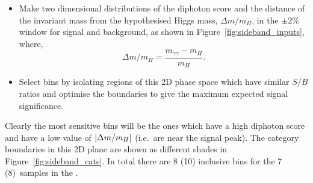 \begin{itemize}
  \item Make two dimensional distributions of the diphoton \BDT score and the distance of the invariant mass from the hypothesised Higgs mass, $\Delta m/m_{H}$, in the $\pm2$\% window for signal and background, as shown in Figure~\ref{fig:sideband_inputs}, where,
    \begin{equation}
      \Delta m/m_{H} = \frac{m_{\gamma\gamma} - m_{H}}{m_{H}}.
    \end{equation}
  \item Select bins by isolating regions of this 2D phase space which have similar $S/B$ ratios and optimise the boundaries to give the maximum expected signal significance.   
\end{itemize}

Clearly the most sensitive bins will be the ones which have a high diphoton \BDT score and have a low value of $|\Delta m/m_{H}|$ (i.e.\ are near the signal peak). The category boundaries in this 2D plane are shown as different shades in Figure~\ref{fig:sideband_cats}. In total there are 8 (10) inclusive bins for the 7 (8)~\TeV samples in the \SMVA.

